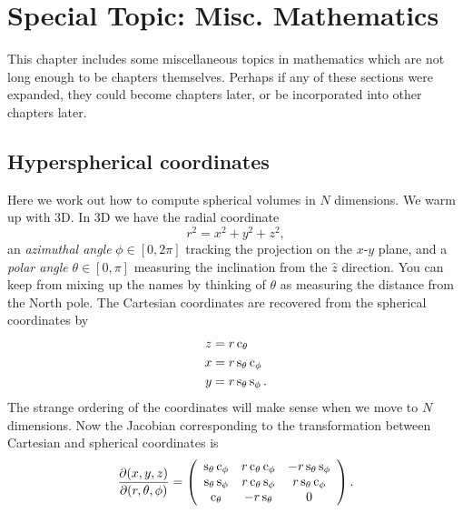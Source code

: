 \chapter{Special Topic: Misc. Mathematics}\label{ap:spec_math}

This chapter includes some miscellaneous topics in mathematics which are
not long enough to be chapters themselves. Perhaps if any of these sections
were expanded, they could become chapters later, or be incorporated into
other chapters later.

\section{Hyperspherical coordinates}

Here we work out how to compute spherical volumes in $N$ dimensions. 
We warm up with 3D. In 3D we have the radial coordinate
\begin{equation}
  r^2=x^2+y^2+z^2,
\end{equation}
an {\it azimuthal angle} $\phi\in[0,2\pi]$ tracking the projection
on the $x$-$y$ plane, and a {\it polar angle} $\theta\in[0,\pi]$ measuring
the inclination from the $\hat{z}$ direction. 
You can keep from mixing up the
names by thinking of $\theta$ as measuring the distance from the North pole.
The Cartesian coordinates are recovered from the spherical coordinates by
\begin{equation}
  \begin{aligned}
    z&=r\operatorname{c}_\theta\\
    x&=r\operatorname{s}_\theta\operatorname{c}_\phi\\
    y&=r\operatorname{s}_\theta\operatorname{s}_\phi.
  \end{aligned}
\end{equation}
The strange ordering of the coordinates will make sense when we move
to $N$ dimensions. Now the Jacobian corresponding to the transformation between 
Cartesian and spherical coordinates is
\begin{equation}
  \frac{\partial(x,y,z)}{\partial(r,\theta,\phi)}
  =\left(\begin{array}{ccc}
     \operatorname{s}_\theta\operatorname{c}_\phi & r\operatorname{c}_\theta\operatorname{c}_\phi & -r\operatorname{s}_\theta\operatorname{s}_\phi \\
     \operatorname{s}_\theta\operatorname{s}_\phi  & r\operatorname{c}_\theta\operatorname{s}_\phi  & r\operatorname{s}_\theta\operatorname{c}_\phi \\
     \operatorname{c}_\theta        & -r\operatorname{s}_\theta         & 0                  \\ 
   \end{array}\right).
\end{equation}

